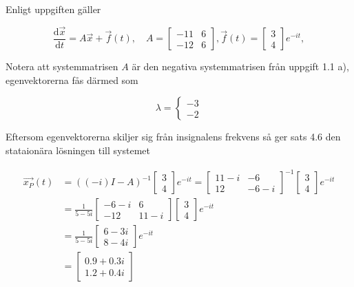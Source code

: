 \documentclass[a4paper]{article}
\newcommand{\mat}[1]{\bm{\mathit{#1}}}
\begin{document}
Enligt uppgiften gäller

\begin{equation*}
  \frac{\text{d}\vec{x}}{\text{d}t} = \mat{A}\vec{x} + \vec{f}(t), \quad \mat{A} = \begin{bmatrix}-11 & 6\\-12 & 6\end{bmatrix}, \vec{f}(t) = \begin{bmatrix}3\\4\end{bmatrix}e^{-it},
\end{equation*}

\noindent Notera att systemmatrisen $\mat{A}$ är den negativa systemmatrisen
från uppgift 1.1 a), egenvektorerna fås därmed som

\begin{equation*}
  \lambda = \begin{cases}-3\\-2\end{cases}
\end{equation*}

\noindent Eftersom egenvektorerna skiljer sig från insignalens frekvens så ger
sats 4.6 den stataionära lösningen till systemet

\begin{align*}
  \vec{x_P}(t) &= ((-i)\mat{I} - \mat{A})^{-1}\begin{bmatrix}3\\4\end{bmatrix}e^{-it} = \begin{bmatrix}11-i & -6\\12 & -6-i\end{bmatrix}^{-1}\begin{bmatrix}3\\4\end{bmatrix}e^{-it}\\[2ex]
  &= \frac{1}{5-5i}\begin{bmatrix}-6-i & 6\\ -12& 11 - i\end{bmatrix}\begin{bmatrix}3\\4\end{bmatrix}e^{-it}\\[2ex]
  &= \frac{1}{5-5i}\begin{bmatrix}6-3i\\8-4i\end{bmatrix}e^{-it}\\
  &= \begin{bmatrix}0.9+0.3i\\1.2 + 0.4i\end{bmatrix}
\end{align*}
\end{document}
